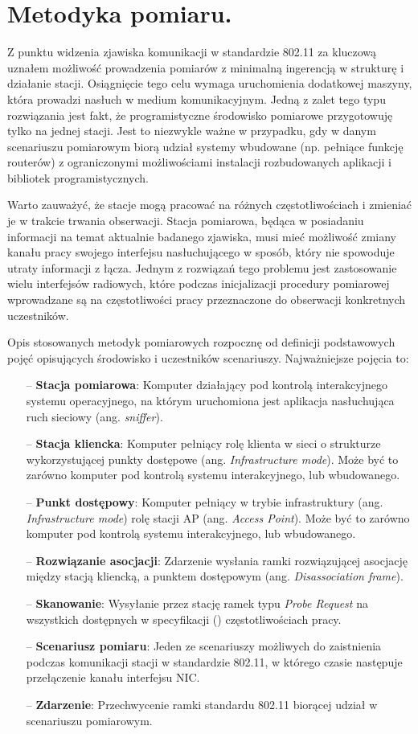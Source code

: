 \section{Metodyka pomiaru.}
Z punktu widzenia zjawiska komunikacji w standardzie 802.11 za kluczową uznałem możliwość prowadzenia pomiarów z minimalną ingerencją w strukturę i działanie stacji. Osiągnięcie tego celu wymaga uruchomienia dodatkowej maszyny, która prowadzi nasłuch w medium komunikacyjnym. Jedną z zalet tego typu rozwiązania jest fakt, że programistyczne środowisko pomiarowe przygotowuję tylko na jednej stacji. Jest to niezwykle ważne w przypadku, gdy w danym scenariuszu pomiarowym biorą udział systemy wbudowane (np. pełniące funkcję routerów) z ograniczonymi możliwościami instalacji rozbudowanych aplikacji i bibliotek programistycznych. 

Warto zauważyć, że stacje mogą pracować na różnych częstotliwościach i zmieniać je w trakcie trwania obserwacji. Stacja pomiarowa, będąca w posiadaniu informacji na temat aktualnie badanego zjawiska, musi mieć możliwość zmiany kanału pracy swojego interfejsu nasłuchującego w sposób, który nie spowoduje utraty informacji z łącza. Jednym z rozwiązań tego problemu jest zastosowanie wielu interfejsów radiowych, które podczas inicjalizacji procedury pomiarowej wprowadzane są na częstotliwości pracy przeznaczone do obserwacji konkretnych uczestników. 

Opis stosowanych metodyk pomiarowych rozpocznę od definicji podstawowych pojęć opisujących środowisko i uczestników scenariuszy. Najważniejsze pojęcia to:
\begin{itemize}
\item[--] {\bf Stacja pomiarowa}: Komputer działający pod kontrolą interakcyjnego systemu operacyjnego, na którym uruchomiona jest aplikacja nasłuchująca ruch sieciowy (ang. \emph{sniffer}).
\item[--] {\bf Stacja kliencka}: Komputer pełniący rolę klienta w sieci o strukturze wykorzystującej punkty dostępowe (ang. \emph{Infrastructure mode}). Może być to zarówno komputer pod kontrolą systemu interakcyjnego, lub wbudowanego.
\item[--] {\bf Punkt dostępowy}: Komputer pełniący w trybie infrastruktury (ang. \emph{Infrastructure mode}) rolę stacji AP (ang. \emph{Access Point}). Może być to zarówno komputer pod kontrolą systemu interakcyjnego, lub wbudowanego.
\item[--] {\bf Rozwiązanie asocjacji}: Zdarzenie wysłania ramki rozwiązującej asocjację między stacją kliencką, a punktem dostępowym (ang. \emph{Disassociation frame}).
\item[--] {\bf Skanowanie}: Wysyłanie przez stację ramek typu \emph{Probe Request} na wszystkich dostępnych w specyfikacji (\cite{std:IEEE80211}) częstotliwościach pracy.
\item[--] {\bf Scenariusz pomiaru}: Jeden ze scenariuszy możliwych do zaistnienia podczas komunikacji stacji w standardzie 802.11, w którego czasie następuje przełączenie kanału interfejsu NIC.
\item[--] {\bf Zdarzenie}: Przechwycenie ramki standardu 802.11 biorącej udział w scenariuszu pomiarowym. 
\end{itemize}

